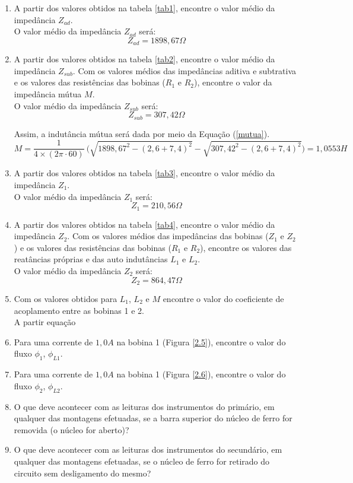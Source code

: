 \documentclass[a4paper,12pt,oneside,openany,table,xcdraw]{article}
\begin{document}
\begin{enumerate}[1 - ]
\item A partir dos valores obtidos na tabela \ref{tab1}, encontre o valor médio da impedância $Z_{ad}$.\\
O valor médio da impedância $Z_{ad}$ será:
$$Z_{ad}=1898,67\Omega$$

\item A partir dos valores obtidos na tabela \ref{tab2}, encontre o valor médio da impedância $Z_{sub}$.
Com os valores médios das impedâncias aditiva e subtrativa e os valores das resistências das
bobinas ($R_1$ e $R_2$), encontre o valor da impedância mútua $M$. \\
O valor médio da impedância $Z_{sub}$ será:
$$Z_{sub}=307,42\Omega$$

Assim, a indutância mútua será dada por meio da Equação (\ref{mutua}).
\begin{equation*}
M = \dfrac{1}{4\times(2\pi \cdot 60)}\ \bigg(\sqrt{1898,67^2-(2,6+7,4)^2} - \sqrt{307,42^2-(2,6+7,4)^2}\bigg) = 1,0553 H
\end{equation*}


\item A partir dos valores obtidos na tabela \ref{tab3}, encontre o valor médio da impedância $Z_1$.\\
O valor médio da impedância $Z_{1}$ será:
$$Z_{1}=210,56\Omega$$

\item A partir dos valores obtidos na tabela \ref{tab4}, encontre o valor médio da impedância $Z_2$.
Com os valores médios das impedâncias das bobinas ($Z_1$ e $Z_2$) e os valores das resistências
das bobinas ($R_1$ e $R_2$), encontre os valores das reatâncias próprias e das auto indutâncias $L_1$
e $L_2$.\\
O valor médio da impedância $Z_{2}$ será:
$$Z_{2}=864,47\Omega$$


\item Com os valores obtidos para $L_1$, $L_2$ e $M$ encontre o valor do coeficiente de acoplamento
entre as bobinas 1 e 2. \\
A partir equação

\item Para uma corrente de $1,0 A$ na bobina 1 (Figura \ref{2.5}), encontre o valor do fluxo $\phi_1$, $\phi_{L1}$. \\
\item Para uma corrente de $1,0 A$ na bobina 1 (Figura \ref{2.6}), encontre o valor do fluxo $\phi_2$, $\phi_{L2}$. \\

\item O que deve acontecer com as leituras dos instrumentos do primário, em qualquer das
montagens efetuadas, se a barra superior do núcleo de ferro for removida (o núcleo for
aberto)? \\

\item O que deve acontecer com as leituras dos instrumentos do secundário, em qualquer das
montagens efetuadas, se o núcleo de ferro for retirado do circuito sem desligamento do
mesmo? \\


\end{enumerate}
\end{document}
